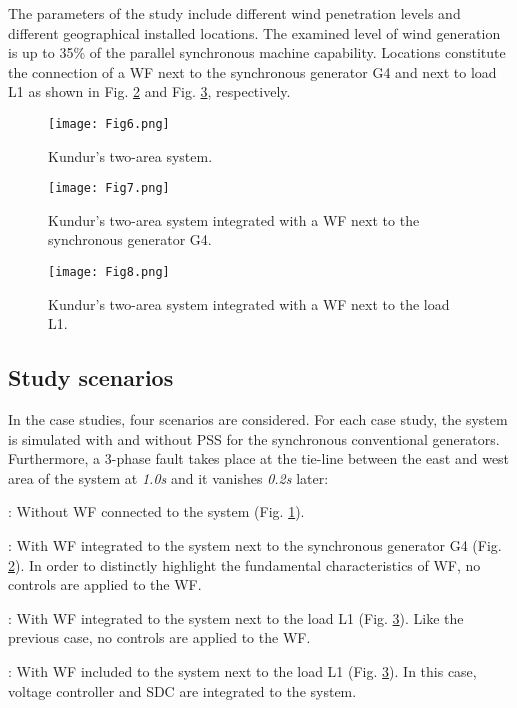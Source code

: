 \documentclass[conference,11pt]{IEEEtran}
\begin{document}
The parameters of the study include different wind penetration levels and different geographical installed locations. The examined level of wind generation is up to 35\% of the parallel synchronous machine capability. Locations constitute the connection of a WF next to the synchronous generator G4 and next to load L1 as shown in Fig. \ref{f:fig7_label} and Fig. \ref{f:fig8_label}, respectively. 


\begin{figure}[t]
  \centering
  \texttt{[image: Fig6.png]}
  \caption{Kundur's two-area system.}
  \label{f:fig6_label}
\end{figure}


\begin{figure}[t]
  \centering
  \texttt{[image: Fig7.png]}
  \caption{Kundur's two-area system integrated with a WF next to the synchronous generator G4.}
  \label{f:fig7_label}
\end{figure}


\begin{figure}[t]
  \centering
  \texttt{[image: Fig8.png]}
  \caption{Kundur's two-area system integrated with a WF next to the load L1.}
  \label{f:fig8_label}
\end{figure}


\subsection{Study scenarios}\label{ss:scenarios}

In the case studies, four scenarios are considered. For each case study, the system is simulated with and without PSS for the synchronous conventional generators. Furthermore, a 3-phase fault takes place at the tie-line between the east and west area of the system at \emph{1.0s} and it vanishes \emph{0.2s} later: 

: Without WF connected to the system (Fig. \ref{f:fig6_label}). 

: With WF integrated to the system next to the synchronous generator G4 (Fig. \ref{f:fig7_label}). In order to distinctly highlight the fundamental characteristics of WF, no controls are applied to the WF. 

: With WF integrated to the system next to the load L1 (Fig. \ref{f:fig8_label}). Like the previous case, no controls are applied to the WF.

: With WF included to the system next to the load L1 (Fig. \ref{f:fig8_label}). In this case, voltage controller and SDC are integrated to the system.
\end{document}
